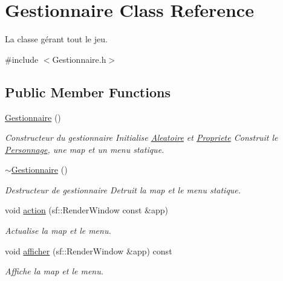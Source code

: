 \hypertarget{classGestionnaire}{\section{Gestionnaire Class Reference}
\label{classGestionnaire}
}


La classe gérant tout le jeu.  




{\ttfamily \#include $<$Gestionnaire.\-h$>$}

\subsection*{Public Member Functions}
\begin{DoxyCompactItemize}
\item 
\hypertarget{classGestionnaire_a1c8e4ce6ef439faab8c9db3f92df6bc8}{\hyperlink{classGestionnaire_a1c8e4ce6ef439faab8c9db3f92df6bc8}{Gestionnaire} ()}\label{classGestionnaire_a1c8e4ce6ef439faab8c9db3f92df6bc8}

\begin{DoxyCompactList}\small\item\em Constructeur du gestionnaire Initialise \hyperlink{classAleatoire}{Aleatoire} et \hyperlink{namespacePropriete}{Propriete} Construit le \hyperlink{classPersonnage}{Personnage}, une map et un menu statique. \end{DoxyCompactList}\item 
\hypertarget{classGestionnaire_a39a3280ade948b6a1c08d113dcc7f375}{\hyperlink{classGestionnaire_a39a3280ade948b6a1c08d113dcc7f375}{$\sim$\-Gestionnaire} ()}\label{classGestionnaire_a39a3280ade948b6a1c08d113dcc7f375}

\begin{DoxyCompactList}\small\item\em Destructeur de gestionnaire Detruit la map et le menu statique. \end{DoxyCompactList}\item 
void \hyperlink{classGestionnaire_adcbeb17e7f4c979c78aa065c3eefdf84}{action} (sf\-::\-Render\-Window const \&app)
\begin{DoxyCompactList}\small\item\em Actualise la map et le menu. \end{DoxyCompactList}\item 
void \hyperlink{classGestionnaire_afa4bd423c658f7735092c2f7b47175fd}{afficher} (sf\-::\-Render\-Window \&app) const 
\begin{DoxyCompactList}\small\item\em Affiche la map et le menu. \end{DoxyCompactList}\end{DoxyCompactItemize}
